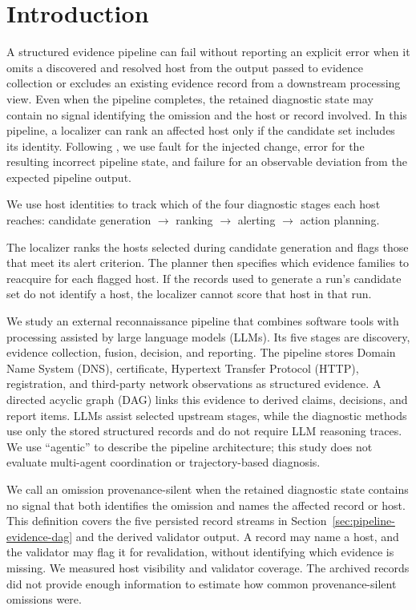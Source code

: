 \documentclass[sn-basic]{sn-jnl}%
\theoremstyle{thmstyleone}%
\theoremstyle{thmstyletwo}%
\theoremstyle{thmstylethree}%
\begin{document}
\section{Introduction}\label{sec:introduction}

A structured evidence pipeline can fail without reporting an explicit error when it omits a discovered and resolved host from the output passed to evidence collection or excludes an existing evidence record from a downstream processing view. Even when the pipeline completes, the retained diagnostic state may contain no signal identifying the omission and the host or record involved. In this pipeline, a localizer can rank an affected host only if the candidate set includes its identity. Following \citet{avizienis2004}, we use fault for the injected change, error for the resulting incorrect pipeline state, and failure for an observable deviation from the expected pipeline output.

We use host identities to track which of the four diagnostic stages each host reaches: candidate generation $\rightarrow$ ranking $\rightarrow$ alerting $\rightarrow$ action planning.

The localizer ranks the hosts selected during candidate generation and flags those that meet its alert criterion. The planner then specifies which evidence families to reacquire for each flagged host. If the records used to generate a run's candidate set do not identify a host, the localizer cannot score that host in that run.

We study an external reconnaissance pipeline that combines software tools with processing assisted by large language models (LLMs). Its five stages are discovery, evidence collection, fusion, decision, and reporting. The pipeline stores Domain Name System (DNS), certificate, Hypertext Transfer Protocol (HTTP), registration, and third-party network observations as structured evidence. A directed acyclic graph (DAG) links this evidence to derived claims, decisions, and report items. LLMs assist selected upstream stages, while the diagnostic methods use only the stored structured records and do not require LLM reasoning traces. We use “agentic” to describe the pipeline architecture; this study does not evaluate multi-agent coordination or trajectory-based diagnosis.

We call an omission provenance-silent when the retained diagnostic state contains no signal that both identifies the omission and names the affected record or host. This definition covers the five persisted record streams in Section~\ref{sec:pipeline-evidence-dag} and the derived validator output. A record may name a host, and the validator may flag it for revalidation, without identifying which evidence is missing. We measured host visibility and validator coverage. The archived records did not provide enough information to estimate how common provenance-silent omissions were.
\end{document}
